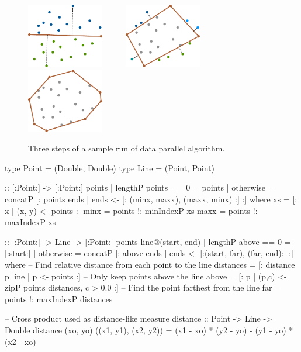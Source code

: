 \documentclass[preamble.tex]{subfiles}
\begin{document}
\begin{figure}
\includegraphics[width=0.3\textwidth]{img/Example-QuickHull-step1}~~~~~%
\includegraphics[width=0.3\textwidth]{img/Example-QuickHull-step2}~~~~~%
\includegraphics[width=0.3\textwidth]{img/Example-QuickHull-step3}%
\caption{Three steps of a sample run of data parallel \QuickHull algorithm.}
\label{fig:qh-result}
\end{figure}


\begin{hscode2}[%
  caption={\label{lst:dph-qh}\name{Data Parallel Haskell} implementation of \QuickHull.},
  numbers=left,
]
type Point = (Double, Double)
type Line  = (Point,  Point)

\QuickHull :: [:Point:] -> [:Point:]
\QuickHull points
  | lengthP points == 0 = points
  | otherwise
  = concatP [: \QuickHullR points ends
                 | ends <- [: (minx, maxx), (maxx, minx) :] :]
  where
    xs   = [: x | (x, y) <- points :]
    minx = points !: minIndexP xs
    maxx = points !: maxIndexP xs

\QuickHullR :: [:Point:] -> Line -> [:Point:]
\QuickHullR points line@(start, end)
  | lengthP above == 0 = [:start:]
  | otherwise
  = concatP [: \QuickHullR above ends
                 | ends <- [:(start, far), (far, end):] :]
  where
    -- Find relative distance from each point to the line
    distances = [: distance p line | p <- points :]
    -- Only keep points above the line
    above = [: p | (p,c) <- zipP points distances, c > 0.0 :]
    -- Find the point farthest from the line
    far = points !: maxIndexP distances

-- Cross product used as distance-like measure
distance :: Point -> Line -> Double
distance (xo, yo) ((x1, y1), (x2, y2))
  = (x1 - xo) * (y2 - yo) - (y1 - yo) * (x2 - xo)
\end{hscode2}
\end{document}

